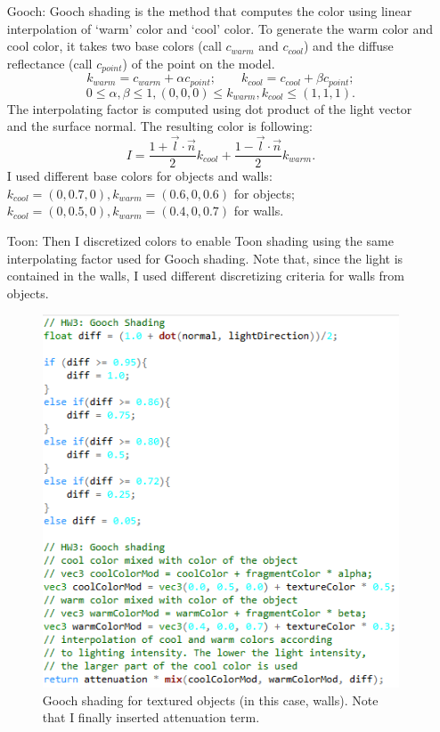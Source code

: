 \documentclass[11pt]{article}
\begin{document}
\begin{itemize}
	\item [Gooch:] Gooch shading is the method that computes the color using linear interpolation of `warm' color and `cool' color.
	To generate the warm color and cool color, it takes two base colors (call $c_{warm}$ and $c_{cool}$) and the diffuse reflectance (call $c_{point}$) of the point on the model.
	\[k_{warm} = c_{warm} + \alpha c_{point}; \qquad k_{cool} = c_{cool} + \beta c_{point}; \] \[0 \leq \alpha, \beta \leq 1, (0,0,0) \leq k_{warm}, k_{cool} \leq (1,1,1).\]
	The interpolating factor is computed using dot product of the light vector and the surface normal. The resulting color is following:
	\[I = \frac{1 + \vec{l} \cdot \vec{n}}{2} k_{cool} + \frac{1 - \vec{l} \cdot \vec{n}}{2} k_{warm}.\]
	I used different base colors for objects and walls: $k_{cool} = (0,0.7,0), k_{warm} = (0.6, 0, 0.6)$ for objects; $k_{cool} = (0, 0.5, 0), k_{warm} = (0.4, 0, 0.7)$ for walls.
	\item [Toon:]
	Then I discretized colors to enable Toon shading using the same interpolating factor used for Gooch shading.
	Note that, since the light is contained in the walls, I used different discretizing criteria for walls from objects.
	\begin{figure}[htb]
		\begin{center}
			\includegraphics[width=0.6\linewidth]{goochtexture.png}
		\end{center}
		\caption{Gooch shading for textured objects (in this case, walls). Note that I finally inserted attenuation term.}
	\end{figure}
\end{itemize}
\end{document}
